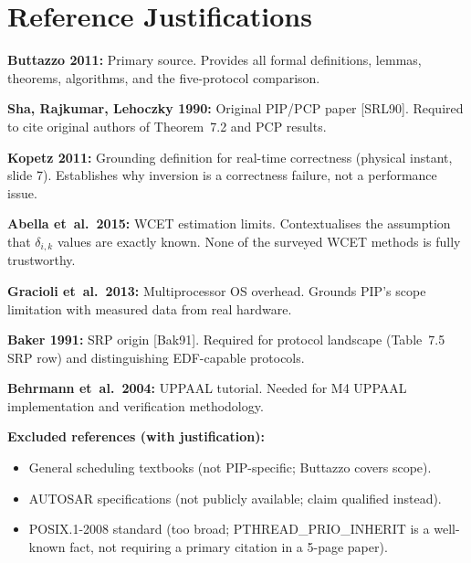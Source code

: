 \documentclass[conference,onecolumn]{IEEEtran}
\begin{document}
\section{Reference Justifications}

\textbf{Buttazzo 2011:} Primary source. Provides all formal
definitions, lemmas, theorems, algorithms, and the five-protocol
comparison.

\textbf{Sha, Rajkumar, Lehoczky 1990:} Original PIP/PCP paper
[SRL90]. Required to cite original authors of Theorem~7.2 and
PCP results.

\textbf{Kopetz 2011:} Grounding definition for real-time correctness
(physical instant, slide 7). Establishes why inversion is a
correctness failure, not a performance issue.

\textbf{Abella et~al.\ 2015:} WCET estimation limits. Contextualises
the assumption that $\delta_{i,k}$ values are exactly known.
None of the surveyed WCET methods is fully trustworthy.

\textbf{Gracioli et~al.\ 2013:} Multiprocessor OS overhead. Grounds
PIP's scope limitation with measured data from real hardware.

\textbf{Baker 1991:} SRP origin [Bak91]. Required for protocol
landscape (Table~7.5 SRP row) and distinguishing EDF-capable protocols.

\textbf{Behrmann et~al.\ 2004:} UPPAAL tutorial. Needed for M4
UPPAAL implementation and verification methodology.

\textbf{Excluded references (with justification):}
\begin{itemize}
  \item General scheduling textbooks (not PIP-specific; Buttazzo covers scope).
  \item AUTOSAR specifications (not publicly available; claim qualified instead).
  \item POSIX.1-2008 standard (too broad; PTHREAD\_PRIO\_INHERIT is a
        well-known fact, not requiring a primary citation in a 5-page paper).
\end{itemize}
\end{document}
